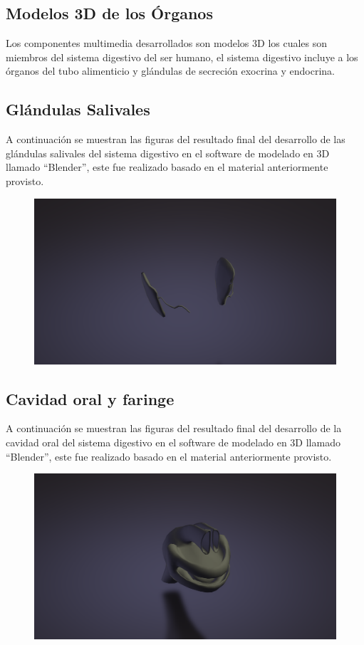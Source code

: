 \subsection{Modelos 3D de los \'Organos}
Los componentes multimedia desarrollados son modelos 3D los cuales son miembros del sistema digestivo del ser humano, 
el sistema digestivo incluye a los órganos del tubo alimenticio y glándulas de secreción exocrina y endocrina.\\

\subsection{Glándulas Salivales}
A continuación se muestran las figuras del resultado final del desarrollo de las glándulas salivales del sistema digestivo 
 en el software de modelado en 3D llamado “Blender”, este fue realizado basado en el material anteriormente provisto.\\
\begin{figure}[H]
	\begin{center}
 		\includegraphics[width = .5\textwidth]{source/images/image41.png}
	\end{center} 
\end{figure}

\subsection{Cavidad oral y faringe}
A continuación se muestran las figuras del resultado final del desarrollo de la cavidad oral del sistema digestivo en el software de modelado en 3D llamado “Blender”, este fue realizado basado en el material anteriormente provisto.\\
\begin{figure}[H]
	\begin{center}
 		\includegraphics[width = .5\textwidth]{source/images/image14.png}
	\end{center} 
\end{figure}

